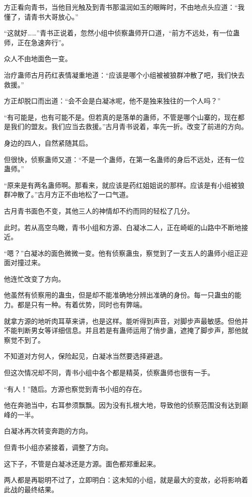 \begin{this_body}
方正看向青书，当他目光触及到青书那温润如玉的眼眸时，不由地点头应道：“我懂了，请青书大哥放心。”

“这就好……”青书正说着，忽然小组中侦察蛊师开口道，“前方不远处，有一位蛊师，正在急速奔行”。

众人不由地面色一变。

治疗蛊师古月药红表情凝重地道：“应该是哪个小组被被狼群冲散了吧，我们快去救援。”

方正却脱口而出道：“会不会是白凝冰呢，他不是独来独往的一个人吗？”

“有可能是，也有可能不是。但若真的是落单的蛊师，不管是哪个山寨的，现在都是我们的盟友。我们应当去救援。”古月青书说着，率先一折。改变了前进的方向。

身边的四人，自然紧随其后。

但很快，侦察蛊师又道：“不是一个蛊师，在第一名蛊师的身后不远处，还有一位蛊师。”

“原来是有两名蛊师啊。那看来，就应该是药红姐姐说的那样。应该是有小组被狼群冲散了。”古月方正不由地松了一口气道。

古月青书面色不变，其他三人的神情却不约而同的轻松了几分。

此时。若从高空鸟瞰，青书小组和方源、白凝冰二人，正在崎岖的山路中不断地接近。

“嗯？”白凝冰的面色微微一变。他有侦察蛊虫，察觉到了一支五人的蛊师小组正迎面对撞过来。

他连忙改变了方向。

他虽然有侦察用的蛊虫，但是却不能准确地分辨出准确的身份。每一只蛊虫的能力。都是只有一种。有着优势，同时也有弊端。

就拿方源的地听肉耳草来讲，也是这样。能听得到声音，对脚步声最敏感。但他并不能判断男女等详细信息。并且若是有蛊师运用了悄步蛊，遮掩了脚步声，那他就察觉不到了。

不知道对方何人，保险起见，白凝冰当然要选择避退。

但这次情况却不同，青书小组中各个都是精英，侦察蛊师也很有一手。

“有人！”随后。方源也察觉到青书小组的存在。

他在奔驰当中，右耳参须飘飘。因为没有扎根大地，导致他的侦察范围没有达到巅峰的一半。

白凝冰再次转变奔跑的方向。

但青书小组亦紧接着，调整了方向。

这下子，不管是白凝冰还是方源。面色都郑重起来。

两人都是再聪明不过了，立即明白：这未知的小组，就是最大的变故，必将影响着此战的最终结果。


\end{this_body}
